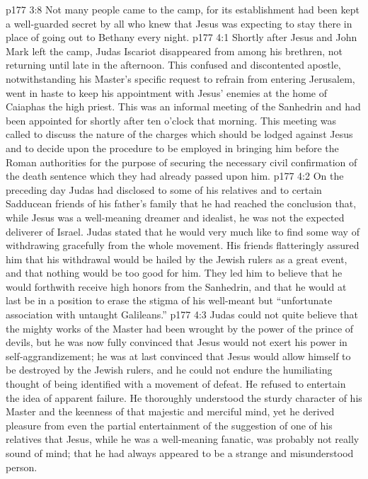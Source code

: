 \pc \vs p177 3:8 Not many people came to the camp, for its establishment had been kept a well\hyp{}guarded secret by all who knew that Jesus was expecting to stay there in place of going out to Bethany every night.
\vs p177 4:1 Shortly after Jesus and John Mark left the camp, Judas Iscariot disappeared from among his brethren, not returning until late in the afternoon. This confused and discontented apostle, notwithstanding his Master’s specific request to refrain from entering Jerusalem, went in haste to keep his appointment with Jesus’ enemies at the home of Caiaphas the high priest. This was an informal meeting of the Sanhedrin and had been appointed for shortly after ten o’clock that morning. This meeting was called to discuss the nature of the charges which should be lodged against Jesus and to decide upon the procedure to be employed in bringing him before the Roman authorities for the purpose of securing the necessary civil confirmation of the death sentence which they had already passed upon him.
\vs p177 4:2 On the preceding day Judas had disclosed to some of his relatives and to certain Sadducean friends of his father’s family that he had reached the conclusion that, while Jesus was a well\hyp{}meaning dreamer and idealist, he was not the expected deliverer of Israel. Judas stated that he would very much like to find some way of withdrawing gracefully from the whole movement. His friends flatteringly assured him that his withdrawal would be hailed by the Jewish rulers as a great event, and that nothing would be too good for him. They led him to believe that he would forthwith receive high honors from the Sanhedrin, and that he would at last be in a position to erase the stigma of his well\hyp{}meant but “unfortunate association with untaught Galileans.”
\vs p177 4:3 Judas could not quite believe that the mighty works of the Master had been wrought by the power of the prince of devils, but he was now fully convinced that Jesus would not exert his power in self\hyp{}aggrandizement; he was at last convinced that Jesus would allow himself to be destroyed by the Jewish rulers, and he could not endure the humiliating thought of being identified with a movement of defeat. He refused to entertain the idea of apparent failure. He thoroughly understood the sturdy character of his Master and the keenness of that majestic and merciful mind, yet he derived pleasure from even the partial entertainment of the suggestion of one of his relatives that Jesus, while he was a well\hyp{}meaning fanatic, was probably not really sound of mind; that he had always appeared to be a strange and misunderstood person.

